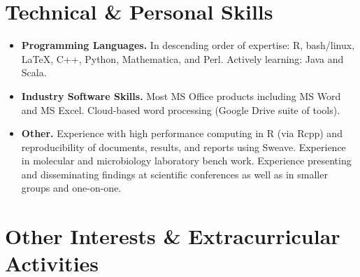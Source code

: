 \documentclass[11pt,letterpaper,sans]{moderncv}        %
\makeatletter
\renewcommand\@biblabel[1]{\textbullet}
\makeatother
\begin{document}
\section{Technical \& Personal Skills}

\vspace{4pt}

\begin{itemize}

\item \textbf{Programming Languages.} In descending order of expertise: R, bash/linux, \LaTeX, C++, Python, Mathematica, and Perl. Actively learning: Java and Scala.

\vspace{4pt}

\item \textbf{Industry Software Skills.} Most MS Office products including MS Word and MS Excel. Cloud-based word processing (Google Drive suite of tools).

\vspace{4pt}

\item \textbf{Other.} Experience with high performance computing in R (via Rcpp) and reproducibility of documents, results, and reports using Sweave.  Experience in molecular and microbiology laboratory bench work. Experience presenting and disseminating findings at scientific conferences as well as in smaller groups and one-on-one.

\end{itemize}


\nocite{*}




\section{Other Interests \& Extracurricular Activities}

\end{document}
